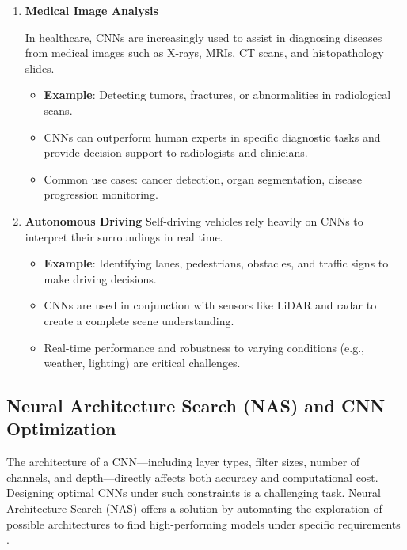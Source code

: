 \begin{enumerate}
\begin{itemize}
    \end{itemize}
   
    \item \textbf{Medical Image Analysis}


    In healthcare, CNNs are increasingly used to assist in diagnosing diseases from medical images such as X-rays, MRIs, CT scans, and histopathology slides.
    \begin{itemize}
        \item \textbf{Example}: Detecting tumors, fractures, or abnormalities in radiological scans.
        \item CNNs can outperform human experts in specific diagnostic tasks and provide decision support to radiologists and clinicians.
        \item Common use cases: cancer detection, organ segmentation, disease progression monitoring.
    \end{itemize}
   
    \item \textbf{Autonomous Driving}
    Self-driving vehicles rely heavily on CNNs to interpret their surroundings in real time.
    \begin{itemize}
        \item \textbf{Example}: Identifying lanes, pedestrians, obstacles, and traffic signs to make driving decisions.
        \item CNNs are used in conjunction with sensors like LiDAR and radar to create a complete scene understanding.
        \item Real-time performance and robustness to varying conditions (e.g., weather, lighting) are critical challenges.
    \end{itemize}
\end{enumerate}
\subsection{Neural Architecture Search (NAS) and CNN Optimization}

The architecture of a CNN---including layer types, filter sizes, number of channels, and depth---directly affects both accuracy and computational cost. Designing optimal CNNs under such constraints is a challenging task. Neural Architecture Search (NAS) offers a solution by automating the exploration of possible architectures to find high-performing models under specific requirements \cite{pau2023quantitative}.

\begin{comment}
NAS is a specialized AutoML technique that identifies the best neural network configuration for a given task and set of constraints. This is especially relevant for embedded applications, where constraints might include limited parameter count, memory size, inference time, or power consumption.   
\end{comment}



